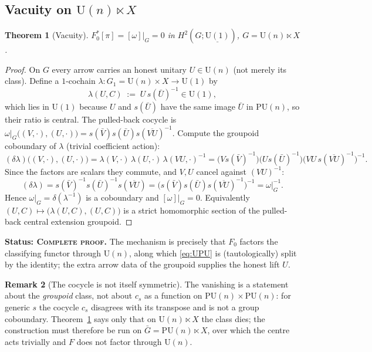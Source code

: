\documentclass[11pt]{article}
\newtheorem{theorem}{Theorem}[section]
\theoremstyle{definition}
\newtheorem{remark}[theorem]{Remark}
\newcommand{\U}{\mathrm{U}}
\newcommand{\PU}{\mathrm{PU}}
\newcommand{\STAT}[1]{\noindent\textbf{Status: #1}}
\newcommand{\COMPLETE}{\textsc{Complete proof}}
\begin{document}
\subsection{Vacuity on $\U(n)\ltimes X$}

\begin{theorem}[Vacuity]\label{thm:vacuity}
$F_0^{*}[\pi]=[\omega]|_{G}=0$ in $H^2(G;\underline{\U(1)})$, $G=\U(n)\ltimes X$.
\end{theorem}

\begin{proof}
On $G$ every arrow carries an honest unitary $U\in\U(n)$ (not merely its class). Define a
$1$-cochain $\lambda\colon G_1=\U(n)\times X\to\U(1)$ by
\[
\lambda(U,C)\;:=\;U\,s(\bar U)^{-1}\in\U(1),
\]
which lies in $\U(1)$ because $U$ and $s(\bar U)$ have the same image $\bar U$ in $\PU(n)$,
so their ratio is central. The pulled-back cocycle is
$\omega|_G\big((V,\cdot),(U,\cdot)\big)=s(\bar V)s(\bar U)s(\overline{VU})^{-1}$. Compute
the groupoid coboundary of $\lambda$ (trivial coefficient action):
\[
(\delta\lambda)\big((V,\cdot),(U,\cdot)\big)
=\lambda(V,\cdot)\,\lambda(U,\cdot)\,\lambda(VU,\cdot)^{-1}
= \big(Vs(\bar V)^{-1}\big)\big(Us(\bar U)^{-1}\big)\big(VU\,s(\overline{VU})^{-1}\big)^{-1}.
\]
Since the factors are scalars they commute, and $V,U$ cancel against $(VU)^{-1}$:
\[
(\delta\lambda)=s(\bar V)^{-1}s(\bar U)^{-1}s(\overline{VU})
=\big(s(\bar V)s(\bar U)s(\overline{VU})^{-1}\big)^{-1}=\omega|_G^{-1}.
\]
Hence $\omega|_G=\delta(\lambda^{-1})$ is a coboundary and $[\omega]|_G=0$. Equivalently
$(U,C)\mapsto\big(\lambda(U,C),(U,C)\big)$ is a strict homomorphic section of the pulled-back
central extension groupoid.
\end{proof}
\STAT{\COMPLETE.} The mechanism is precisely that $F_0$ factors the classifying functor
through $\U(n)$, along which \eqref{eq:UPU} is (tautologically) split by the identity; the
extra arrow data of the groupoid supplies the honest lift $U$.

\begin{remark}[The cocycle is not itself symmetric]
The vanishing is a statement about the \emph{groupoid} class, not about $c_s$ as a function
on $\PU(n)\times\PU(n)$: for generic $s$ the cocycle $c_s$ disagrees with its transpose and
is not a group coboundary. Theorem~\ref{thm:vacuity} says only that on $\U(n)\ltimes X$ the
class dies; the construction must therefore be run on $\bar G=\PU(n)\ltimes X$, over which
the centre acts trivially and $F$ does not factor through $\U(n)$.
\end{remark}
\end{document}
